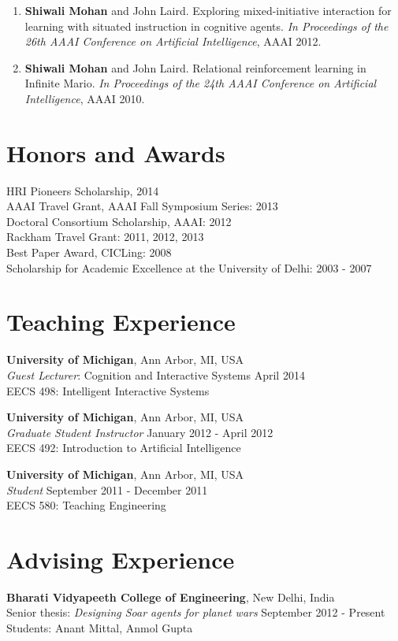 \documentclass[margin,line,11pt]{res}
\begin{document}
\begin{resume}
\begin{enumerate}[label=\lbrack A\arabic*\rbrack,leftmargin=*]
\item \textbf{Shiwali Mohan} and John Laird. Exploring mixed-initiative interaction for learning with situated instruction in cognitive agents. \emph{In Proceedings of the 26th AAAI Conference on Artificial Intelligence}, AAAI 2012.

\item \textbf{Shiwali Mohan} and John Laird. Relational reinforcement learning in Infinite Mario. \emph{In Proceedings of the
24th AAAI Conference on Artificial Intelligence}, AAAI 2010.
\end{enumerate}

\section{\sc Honors and Awards} 
HRI Pioneers Scholarship, 2014\\
AAAI Travel Grant, AAAI Fall Symposium Series: 2013\\
Doctoral Consortium Scholarship, AAAI: 2012 \\
Rackham Travel Grant: 2011, 2012, 2013 \\
Best Paper Award, CICLing: 2008 \\
Scholarship for Academic Excellence at the University of Delhi: 2003 - 2007 

\section{\sc Teaching Experience}
\textbf{University of Michigan}, Ann Arbor, MI, USA \\
\emph{Guest Lecturer}: Cognition and Interactive Systems \hfill April 2014 \\
EECS 498: Intelligent Interactive Systems

\textbf{University of Michigan}, Ann Arbor, MI, USA \\
\emph{Graduate Student Instructor} \hfill January 2012 - April 2012 \\
EECS 492: Introduction to Artificial Intelligence

\textbf{University of Michigan}, Ann Arbor, MI, USA \\
\emph{Student}  \hfill September 2011 - December 2011\\
EECS 580: Teaching Engineering

\section{\sc Advising Experience}
\textbf{Bharati Vidyapeeth College of Engineering}, New Delhi, India\\
Senior thesis: \emph{Designing Soar agents for planet wars} \hfill September 2012 - Present\\
Students: Anant Mittal, Anmol Gupta


\end{resume}
\end{document}
